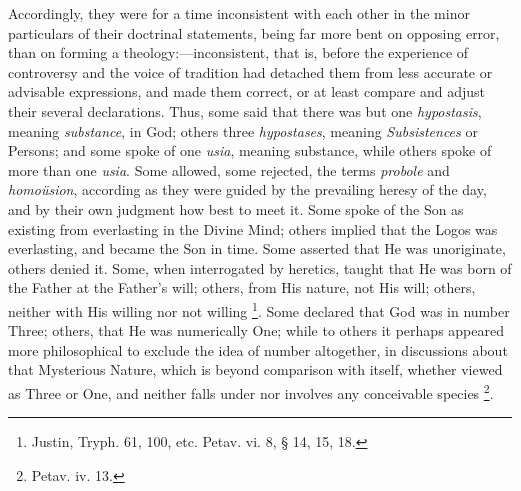 Accordingly, they were for a time inconsistent with each other in
the minor particulars of their doctrinal statements, being far more
bent on opposing error, than on forming a theology:—inconsistent,
that is, before the experience of controversy and the voice of
tradition had detached them from less accurate or advisable
expressions, and made them correct, or at least compare and adjust
their several declarations. Thus, some said that there was but one \emph{hypostasis},
meaning \emph{substance}, in God; others three \emph{hypostases},
meaning \emph{Subsistences} or Persons; and some spoke of one \emph{usia},
meaning substance, while others spoke of more than one \emph{usia}.
Some allowed, some rejected, the terms \emph{probole} and \emph{homoüsion},
according as they were guided by the prevailing heresy of the day, and
by their own judgment how best to meet it. Some spoke of the Son as
existing from everlasting in the Divine Mind; others implied that the
Logos was everlasting, and became the Son in time. Some asserted that
He was unoriginate, others denied it. Some, when interrogated by
heretics, taught that He was born of the Father at the Father's
will; others, from His nature, not His will; others, neither with His
willing nor not willing \footnote{Justin, Tryph. 61, 100, etc. Petav. vi. 8,
§ 14, 15, 18.}.
Some declared that God was in number Three; others, that He was
numerically One; while to others it perhaps appeared more
philosophical to exclude the idea of number altogether, in discussions
about that Mysterious Nature, which is beyond comparison with itself,
whether viewed as Three or One, and neither falls under nor involves
any conceivable species \footnote{Petav. iv. 13.}.


